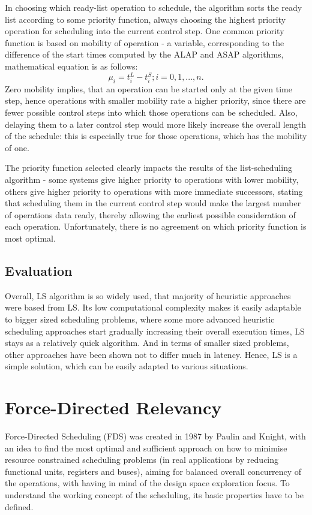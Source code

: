 \documentclass[conference]{IEEEtran}
\begin{document}
In choosing which ready-list operation to schedule, the algorithm sorts the ready list according to some priority function, always choosing the highest priority operation for scheduling into the current control step. One common priority function is based on mobility of operation - a variable, corresponding to the difference of the start times computed by the ALAP and ASAP algorithms, 
mathematical equation is as follows: 
\begin{equation*}
\displaystyle \mu_i = t_i^L - t_i^S; i = 0, 1, ..., n.
\end{equation*}
Zero mobility implies, that an operation can be started only at the given time step, hence operations with smaller mobility rate a higher priority, since there are fewer possible control steps into which those operations can be scheduled. Also, delaying them to a later control step would more likely increase the overall length of the schedule: this is especially true for those operations, which has the mobility of one.

The priority function selected clearly impacts the results of the list-scheduling algorithm - some systems give higher priority to operations with lower mobility, others give higher priority to operations with more immediate successors, stating that scheduling them in the current control step would make the largest number of operations data ready, thereby allowing the earliest possible consideration of each operation. Unfortunately, there is no agreement on which priority function is most optimal.

\subsection{Evaluation}

Overall, LS algorithm is so widely used, that majority of heuristic approaches were based from LS. Its low computational complexity makes it easily adaptable to bigger sized scheduling problems, where some more advanced heuristic scheduling approaches start gradually increasing their overall execution times, LS stays as a relatively quick algorithm. And in terms of smaller sized problems, other approaches have been shown not to differ much in latency. Hence, LS is a simple solution, which can be easily adapted to various situations.

\section{Force-Directed Relevancy}
Force-Directed Scheduling (FDS) \cite{b1} was created in 1987 by Paulin and Knight, with an idea to find the most optimal and sufficient approach on how to minimise resource constrained scheduling problems (in real applications by reducing functional units, registers and buses), aiming for balanced overall concurrency of the operations, with having in mind of the design space exploration focus. To understand the working concept of the scheduling, its basic properties have to be defined.
\end{document}
